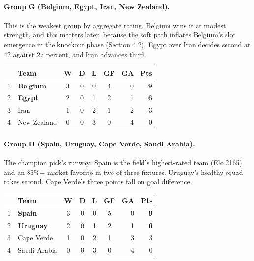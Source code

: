 \documentclass[11pt,letterpaper]{article}
\begin{document}
\paragraph{Group G (Belgium, Egypt, Iran, New Zealand).} This is the weakest group by aggregate rating. Belgium wins it at modest strength, and this matters later, because the soft path inflates Belgium's slot emergence in the knockout phase (Section 4.2). Egypt over Iran decides second at 42 against 27 percent, and Iran advances third.
\smallskip{}\\[1pt]
{\footnotesize
\begin{tabular}{@{}clccccrr@{}}
\toprule
 & Team & W & D & L & GF & GA & Pts \\
\midrule
1 & \textbf{Belgium} & 3 & 0 & 0 & 4 & 0 & \textbf{9} \\
2 & \textbf{Egypt} & 2 & 0 & 1 & 2 & 1 & \textbf{6} \\
3 & Iran & 1 & 0 & 2 & 1 & 2 & 3 \\
4 & New Zealand & 0 & 0 & 3 & 0 & 4 & 0 \\
\bottomrule
\end{tabular}}\smallskip

\paragraph{Group H (Spain, Uruguay, Cape Verde, Saudi Arabia).} The champion pick's runway: Spain is the field's highest-rated team (Elo 2165) and an 85\%+ market favorite in two of three fixtures. Uruguay's healthy squad takes second. Cape Verde's three points fall on goal difference.
\smallskip{}\\[1pt]
{\footnotesize
\begin{tabular}{@{}clccccrr@{}}
\toprule
 & Team & W & D & L & GF & GA & Pts \\
\midrule
1 & \textbf{Spain} & 3 & 0 & 0 & 5 & 0 & \textbf{9} \\
2 & \textbf{Uruguay} & 2 & 0 & 1 & 2 & 1 & \textbf{6} \\
3 & Cape Verde & 1 & 0 & 2 & 1 & 3 & 3 \\
4 & Saudi Arabia & 0 & 0 & 3 & 0 & 4 & 0 \\
\bottomrule
\end{tabular}}\smallskip
\end{document}
